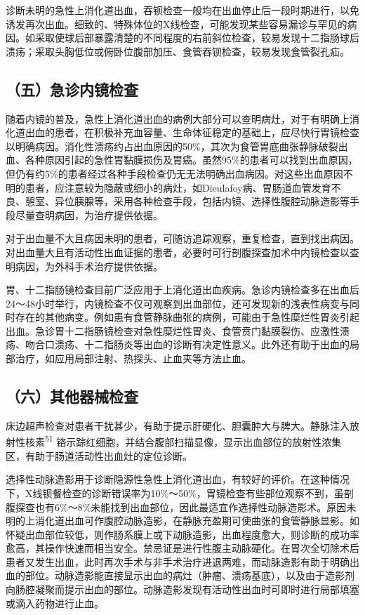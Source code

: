 诊断未明的急性上消化道出血，吞钡检查一般均在出血停止后一段时期进行，以免诱发再次出血。细致的、特殊体位的X线检查，可能发现某些容易漏诊与罕见的病因。如采取使球后部暴露清楚的不同程度的右前斜位检查，较易发现十二指肠球后溃疡；采取头胸低位或俯卧位腹部加压、食管吞钡检查，较易发现食管裂孔疝。

\subsection{（五）急诊内镜检查}

随着内镜的普及，急性上消化道出血的病例大部分可以查明病灶，对于有明确上消化道出血的患者，在积极补充血容量、生命体征稳定的基础上，应尽快行胃镜检查以明确病因。消化性溃疡约占出血原因的50\%，其次为食管胃底曲张静脉破裂出血、各种原因引起的急性胃黏膜损伤及胃癌。虽然95\%的患者可以找到出血原因，但仍有约5\%的患者经过各种手段检查仍无无法明确出血病因。对这些出血原因不明的患者，应注意较为隐蔽或细小的病灶，如Dieulafoy病、胃肠道血管发育不良、憩室、异位胰腺等，采用各种检查手段，包括内镜、选择性腹腔动脉造影等手段尽量查明病因，为治疗提供依据。

对于出血量不大且病因未明的患者，可随访追踪观察，重复检查，直到找出病因。对出血量大且有活动性出血证据的患者，必要时可行剖腹探查加术中内镜检查以查明病因，为外科手术治疗提供依据。

胃、十二指肠镜检查目前广泛应用于上消化道出血疾病。急诊内镜检查多在出血后24～48小时举行，内镜检查不仅可观察到出血部位，还可发现新的浅表性病变与同时存在的其他病变。例如患有食管静脉曲张的病例，可能由于急性糜烂性胃炎引起出血。急诊胃十二指肠镜检查对急性糜烂性胃炎、食管贲门黏膜裂伤、应激性溃疡、吻合口溃疡、十二指肠炎等出血的诊断有决定性意义。此外还有助于出血的局部治疗，如应用局部注射、热探头、止血夹等方法止血。

\subsection{（六）其他器械检查}

床边超声检查对患者干扰甚少，有助于提示肝硬化、胆囊肿大与脾大。静脉注入放射性核素\textsuperscript{51}
铬示踪红细胞，并结合腹部扫描显像，显示出血部位的放射性浓集区，有助于肠道活动性出血灶的定位诊断。

选择性动脉造影用于诊断隐源性急性上消化道出血，有较好的评价。在这种情况下，X线钡餐检查的诊断错误率为10\%～50\%，胃镜检查有些部位观察不到，虽剖腹探查也有6\%～8\%未能找到出血部位，因此最适宜作选择性动脉造影术。原因未明的上消化道出血可作腹腔动脉造影，在静脉充盈期可使曲张的食管静脉显影。如怀疑出血部位较低，则作肠系膜上或下动脉造影，出血程度愈大，则诊断的成功率愈高，其操作快速而相当安全。禁忌证是进行性腹主动脉硬化。在胃次全切除术后患者又发生出血，此时再次手术与非手术治疗进退两难，而动脉造影有助于明确出血的部位。动脉造影能直接显示出血的病灶（肿瘤、溃疡基底），以及由于造影剂向肠腔凝聚而提示出血的部位。动脉造影发现有活动性出血时可即时进行局部填塞或滴入药物进行止血。

